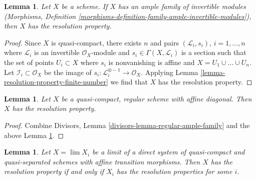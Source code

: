 \documentclass{stacks-project}
\theoremstyle{plain}
\newtheorem{lemma}[subsection]{Lemma}
\theoremstyle{definition}
\theoremstyle{remark}
\numberwithin{equation}{subsection}
\def\lim{\mathop{\mathrm{lim}}\nolimits}
\begin{document}
\begin{lemma}
\label{lemma-resolution-property-ample-family}
Let $X$ be a scheme. If $X$ has an ample family of invertible modules
(Morphisms, Definition
\ref{morphisms-definition-family-ample-invertible-modules}),
then $X$ has the resolution property.
\end{lemma}

\begin{proof}
Since $X$ is quasi-compact, there exists $n$ and pairs
$(\mathcal{L}_i, s_i)$, $i = 1, \ldots, n$ where
$\mathcal{L}_i$ is an invertible $\mathcal{O}_X$-module and
$s_i \in \Gamma(X, \mathcal{L}_i)$ is a section
such that the set of points $U_i \subset X$ where $s_i$ is nonvanishing
is affine and $X = U_1 \cup \ldots \cup U_n$.
Let $\mathcal{I}_i \subset \mathcal{O}_X$ be the image
of $s_i : \mathcal{L}_i^{\otimes -1} \to \mathcal{O}_X$.
Applying Lemma \ref{lemma-resolution-property-finite-number}
we find that $X$ has the resolution property.
\end{proof}

\begin{lemma}
\label{lemma-regular-resolution-property}
Let $X$ be a quasi-compact, regular scheme with affine diagonal.
Then $X$ has the resolution property.
\end{lemma}

\begin{proof}
Combine Divisors, Lemma \ref{divisors-lemma-regular-ample-family} and the above
Lemma \ref{lemma-resolution-property-ample-family}.
\end{proof}

\begin{lemma}
\label{lemma-resolution-property-descends}
Let $X = \lim X_i$ be a limit of a direct system of quasi-compact
and quasi-separated schemes with affine transition morphisms.
Then $X$ has the resolution property if and only if $X_i$ has
the resolution properties for some $i$.
\end{lemma}
\end{document}
